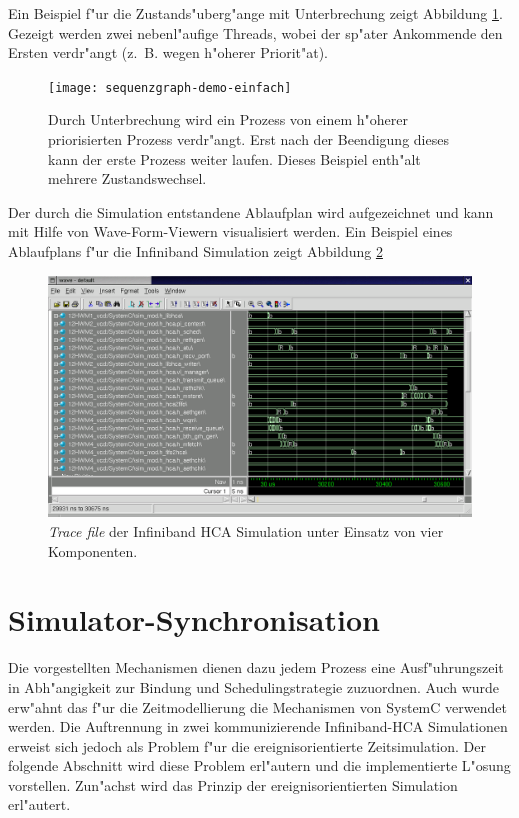 Ein Beispiel f"ur die Zustands"uberg"ange mit Unterbrechung zeigt Abbildung
\ref{fig:seq-demo}. Gezeigt werden zwei nebenl"aufige Threads, wobei der sp"ater
Ankommende den Ersten verdr"angt (z.~B. wegen h"oherer Priorit"at).
\begin{figure}
\begin{center}
\texttt{[image: sequenzgraph-demo-einfach]}
\caption{Durch Unterbrechung wird ein Prozess von einem h"oherer priorisierten Prozess
  verdr"angt. Erst nach der Beendigung dieses kann der erste Prozess weiter
  laufen. Dieses Beispiel enth"alt mehrere Zustandswechsel.}
\label{fig:seq-demo}
\end{center}
\end{figure}



Der durch die Simulation entstandene Ablaufplan wird aufgezeichnet und 
kann mit Hilfe von Wave-Form-Viewern visualisiert werden. Ein Beispiel eines
Ablaufplans f"ur die Infiniband Simulation zeigt Abbildung \ref{fig:trace}

\begin{figure}
\begin{center}
\includegraphics[width=14cm]{infiniband-mixed-mixed-trace}
\caption{\emph{Trace file} der Infiniband HCA Simulation unter Einsatz von vier Komponenten.}%
\label{fig:trace}
\end{center}
\end{figure}


\section{Simulator-Synchronisation}
Die vorgestellten Mechanismen dienen dazu jedem Prozess eine 
Ausf"uhrungszeit in Abh"angigkeit zur Bindung und Schedulingstrategie 
zuzuordnen. Auch wurde erw"ahnt das f"ur die Zeitmodellierung die 
Mechanismen von SystemC verwendet werden. Die Auftrennung in zwei 
kommunizierende Infiniband-HCA Simulationen erweist sich jedoch als Problem
f"ur die ereignisorientierte Zeitsimulation. Der folgende Abschnitt
wird diese Problem erl"autern und die implementierte L"osung 
vorstellen. Zun"achst wird das Prinzip der ereignisorientierten Simulation
erl"autert.

